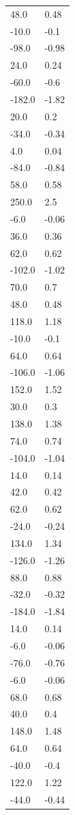 \begin{longtable}{ll}
48.0 & 0.48 \\
-10.0 & -0.1 \\
-98.0 & -0.98 \\
24.0 & 0.24 \\
-60.0 & -0.6 \\
-182.0 & -1.82 \\
20.0 & 0.2 \\
-34.0 & -0.34 \\
4.0 & 0.04 \\
-84.0 & -0.84 \\
58.0 & 0.58 \\
250.0 & 2.5 \\
-6.0 & -0.06 \\
36.0 & 0.36 \\
62.0 & 0.62 \\
-102.0 & -1.02 \\
70.0 & 0.7 \\
48.0 & 0.48 \\
118.0 & 1.18 \\
-10.0 & -0.1 \\
64.0 & 0.64 \\
-106.0 & -1.06 \\
152.0 & 1.52 \\
30.0 & 0.3 \\
138.0 & 1.38 \\
74.0 & 0.74 \\
-104.0 & -1.04 \\
14.0 & 0.14 \\
42.0 & 0.42 \\
62.0 & 0.62 \\
-24.0 & -0.24 \\
134.0 & 1.34 \\
-126.0 & -1.26 \\
88.0 & 0.88 \\
-32.0 & -0.32 \\
-184.0 & -1.84 \\
14.0 & 0.14 \\
-6.0 & -0.06 \\
-76.0 & -0.76 \\
-6.0 & -0.06 \\
68.0 & 0.68 \\
40.0 & 0.4 \\
148.0 & 1.48 \\
64.0 & 0.64 \\
-40.0 & -0.4 \\
122.0 & 1.22 \\
-44.0 & -0.44 \\

\end{longtable}
